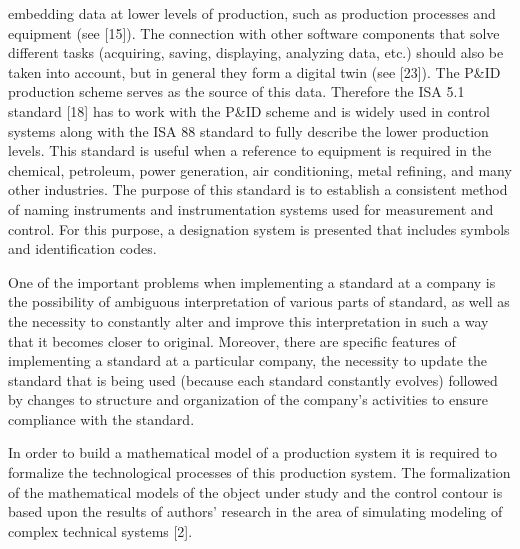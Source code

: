 \documentclass{article}
\begin{document}
\begin{minipage}[t]{0.45\textwidth}
    embedding data at lower levels of production, such as production processes and equipment (see [15]). The connection with other software components that solve different tasks (acquiring, saving, displaying, analyzing data, etc.) should also be taken into account, but in general they form a digital twin (see [23]). The P\&ID production scheme serves as the source of this data. Therefore the ISA 5.1 standard [18] has to work with the P\&ID scheme and is widely used in control systems along with the ISA 88 standard to fully describe the lower production levels. This standard is useful when a reference to equipment is required in the chemical, petroleum, power generation, air conditioning, metal refining, and many other industries. The purpose of this standard is to establish a consistent method of naming instruments and instrumentation systems used for measurement and control. For this purpose, a designation system is presented that includes symbols and identification codes.
    
    \hspace{0.2cm} One of the important problems when implementing a standard at a company is the possibility of ambiguous interpretation of various parts of standard, as well as the necessity to constantly alter and improve this interpretation in such a way that it becomes closer to original. Moreover, there are specific features of implementing a standard at a particular company, the necessity to update the standard that is being used (because each standard constantly evolves) followed by changes to structure and organization of the company’s activities to ensure compliance with the standard.

    \hspace{0.2cm} In order to build a mathematical model of a production system it is required to formalize the technological processes of this production system. The formalization of the mathematical models of the object under study and the control contour is based upon the results of authors’ research in the area of simulating modeling of complex technical systems [2].


\end{minipage}
\end{document}
